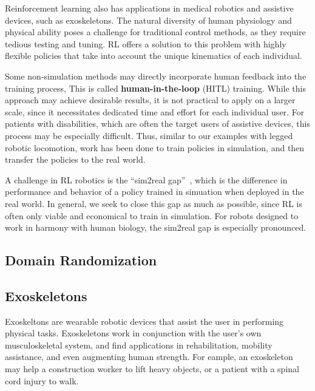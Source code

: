 \documentclass[12pt]{report}
\theoremstyle{definition}
\theoremstyle{remark}
\begin{document}
Reinforcement learning also has applications in medical robotics and assistive devices, such as exoskeletons. The natural diversity of human physiology and physical ability poses a challenge for traditional control methods, as they require tedious testing and tuning. RL offers a solution to this problem with highly flexible policies that take into account the unique kinematics of each individual.

Some non-simulation methods may directly incorporate human feedback into the training process, This is called \textbf{human-in-the-loop} (HITL) training. While this approach may achieve desirable results, it is not practical to apply on a larger scale, since it necessitates dedicated time and effort for each individual user. For patients with disabilities, which are often the target users of assistive devices, this process may be especially difficult. Thus, similar to our examples with legged robotic locomotion, work has been done to train policies in simulation, and then transfer the policies to the real world.

A challenge in RL robotics is the ``sim2real gap''~\cite{luo_experiment-free_2024}, which is the difference in performance and behavior of a policy trained in simuation when deployed in the real world. In general, we seek to close this gap as much as possible, since RL is often only viable and economical to train in simulation. For robots designed to work in harmony with human biology, the sim2real gap is especially pronounced.

\subsection{Domain Randomization}

\subsection{Exoskeletons}
Exoskeltons are wearable robotic devices that assist the user in performing physical tasks. Exoskeletons work in conjunction with the user's own musculoskeletal system, and find applications in rehabilitation, mobility assistance, and even augmenting human strength. For eample, an exoskeleton may help a construction worker to lift heavy objects, or a patient with a spinal cord injury to walk.
\end{document}
